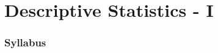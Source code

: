 \documentclass[
10pt, %
a4paper, %
]{report}
\begin{document}
\pagestyle{myheadings} %



\thispagestyle{plain} %

\printtitle %


\part{Descriptive Statistics - I} 

\section*{Syllabus}
\end{document}
